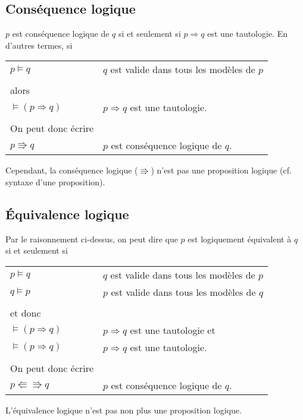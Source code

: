 		\subsection{Conséquence logique}
			$p$ est conséquence logique de $q$ si et seulement si $p \Rightarrow q$ est une tautologie. En d'autres termes, si
			\begin{center}
			\begin{tabular}{ll}
			$p \models q$ & $q$ est valide dans tous les modèles de $p$ \\
			&\\
			alors & \\
			$\models (p \Rightarrow q)$ & $p \Rightarrow q$ est une tautologie.\\
			&\\
			On peut donc écrire & \\
			$p \Rrightarrow q$ & $p$ est conséquence logique de $q$.\\
			\end{tabular}
			\end{center}
			Cependant, la conséquence logique ($\Rrightarrow$) n'est pas une proposition logique (cf. syntaxe d'une proposition).
		
		\subsection{Équivalence logique}
			Par le raisonnement ci-dessus, on peut dire que $p$ est logiquement équivalent à $q$ si et seulement si
			\begin{center}
			\begin{tabular}{ll}
			$p \models q$ & $q$ est valide dans tous les modèles de $p$ \\
			$q \models p$ & $p$ est valide dans tous les modèles de $q$ \\
			&\\
			et donc & \\
			$\models (p \Rightarrow q)$ & $p \Rightarrow q$ est une tautologie et\\
			$\models (p \Rightarrow q)$ & $p \Rightarrow q$ est une tautologie.\\
			&\\
			On peut donc écrire & \\
			$p \Lleftarrow \Rrightarrow q$ & $p$ est conséquence logique de $q$.\\ 
			\end{tabular}
			\end{center}
			L'équivalence logique n'est pas non plus une proposition logique.\\
			
